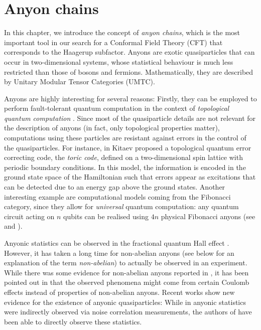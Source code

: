 \chapter{Anyon chains}
\label{sec:anyons}

In this chapter, we introduce the concept of \emph{anyon chains}, which is the most important tool in our search for a Conformal Field Theory (CFT) that corresponds to the Haagerup subfactor. Anyons are exotic quasiparticles that can occur in two-dimensional systems, whose statistical behaviour is much less restricted than those of bosons and fermions. Mathematically, they are described by Unitary Modular Tensor Categories (UMTC). 

Anyons are highly interesting for several reasons: Firstly, they can be employed to perform fault-tolerant quantum computation in the context of \emph{topological quantum computation} \cite{Nayak2008,Pachos2009,Wang2010,kitaev_anyons_2006}. Since most of the quasiparticle details are not relevant for the description of anyons (in fact, only topological properties matter), computations using these particles are resistant against errors in the control of the quasiparticles. For instance, in \cite{Kitaev2003} Kitaev proposed a topological quantum error correcting code, the \emph{toric code}, defined on a two-dimensional spin lattice with periodic boundary conditions. In this model, the information is encoded in the ground state space of the Hamiltonian such that errors appear as excitations that can be detected due to an energy gap above the ground states. Another interesting example are computational models coming from the Fibonacci category, since they allow for \emph{universal} quantum computation: any quantum circuit acting on $n$ qubits can be realised using $4n$ physical Fibonacci anyons (see \cite{Freedman2002} and \cite{Preskill2004}).

Anyonic statistics can be observed in the fractional quantum Hall effect \cite{Arovas1984,Halperin1984,Jeon2003,CAS13}. However, it has taken a long time for non-abelian anyons (see below for an explanation of the term \emph{non-abelian}) to actually be observed in an experiment. While there was some evidence for non-abelian anyons reported in \cite{Willett2013}, it has been pointed out in \cite{Keyserlingk2015} that the observed phenomena might come from certain Coulomb effects instead of properties of non-abelian anyons. Recent works show new evidence for the existence of anyonic quasiparticles: While in \cite{Bartolomei2020} anyonic statistics were indirectly observed via noise correlation measurements, the authors of \cite{Nakamura2020} have been able to directly observe these statistics.

